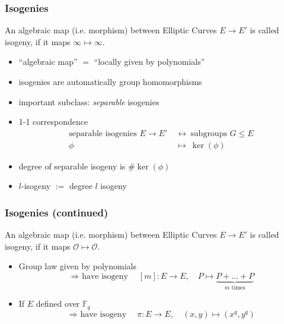 \documentclass{beamer}
\newcommand{\F}{\mathbb{F}}
\renewcommand{\O}{\mathcal{O}}
\begin{document}
\begin{frame}
    \frametitle{Isogenies}

    \begin{definition}
        An algebraic map (i.e. morphism) between Elliptic Curves $E \to E'$ is called isogeny, if it maps $\infty \mapsto \infty$.
    \end{definition}
    \begin{itemize}[<+->]
        \item ``algebraic map'' $=$ ``locally given by polynomials''
        \item isogenies are automatically group homomorphisms
        \item important subclass: \emph{separable} isogenies
        \item 1-1 correspondence
        \begin{align*}
            \text{separable isogenies $E \to E'$} \ &\leftrightarrow \ \text{subgroups $G \leq E$} \\
            \phi \ &\mapsto \ \ker(\phi)
        \end{align*}
        \item degree of separable isogeny is $\#\ker(\phi)$
        \item $l$-isogeny $:=$ degree $l$ isogeny
    \end{itemize}
\end{frame}

\begin{frame}
    \frametitle{Isogenies (continued)}
    
    \begin{definition}
        An algebraic map (i.e. morphism) between Elliptic Curves $E \to E'$ is called isogeny, if it maps $\O \mapsto \O$.
    \end{definition}

    \begin{itemize}[<+->]
        \item Group law given by polynomials
        \begin{equation*}
            \text{$\Rightarrow$ have isogeny} \quad [m]: E \to E, \quad P \mapsto \underbrace{P + ... + P}_{\text{$m$ times}}
        \end{equation*}
        \item If $E$ defined over $\F_q$
        \begin{equation*}
            \text{$\Rightarrow$ have isogeny} \quad \pi: E \to E, \quad (x, y) \mapsto (x^q, y^q)
        \end{equation*}
    \end{itemize}
\end{frame}
\end{document}
